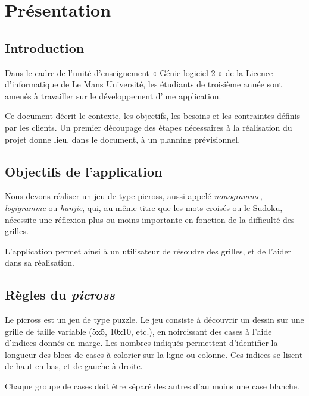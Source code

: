 \documentclass[a4paper, 12pt]{report}
\begin{document}
\renewcommand{\contentsname}{Sommaire}
\tableofcontents

\newpage
\chapter{Présentation}
\vspace*{0.5cm}
	\section{Introduction}

		Dans le cadre de l'unité d'enseignement « Génie logiciel 2 » de la Licence d'informatique de Le Mans Université, les étudiants de troisième année sont amenés à travailler sur le développement d'une application.
		
		Ce document décrit le contexte, les objectifs, les besoins et les contraintes définis par les clients. Un premier découpage des étapes nécessaires à la réalisation du projet donne lieu, dans le document, à un planning prévisionnel.

	
 	\section{Objectifs de l'application}	
 	
		Nous devons réaliser un jeu de type picross, aussi appelé \textit{nonogramme}, \textit{logigramme} ou \textit{hanjie}, qui, au même titre que les mots croisés ou le Sudoku, nécessite une réflexion plus ou moins importante en fonction de la difficulté des grilles.
		
		L'application permet ainsi à un utilisateur de résoudre des grilles, et de l'aider dans sa réalisation.

	\section{Règles du \textit{picross}}
	
		Le picross est un jeu de type puzzle. Le jeu consiste à découvrir un dessin sur une grille de taille variable (5x5, 10x10, etc.), en noircissant des cases à l'aide d'indices donnés en marge.
		Les nombres indiqués permettent d'identifier la longueur des blocs de cases à colorier sur la ligne ou colonne. Ces indices se lisent de haut en bas, et de gauche à droite.
		
		Chaque groupe de cases doit être séparé des autres d'au moins une case blanche.
		
\end{document}

